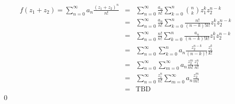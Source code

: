 \documentclass[10pt]{amsart}
\theoremstyle{nonumberplain}
\begin{document}
\begin{enumerate}[label={\bf {\arabic*}:}]
\begin{eqnarray*}
f(z_1 + z_2) = \sum_{n=0}^\infty a_n\frac{(z_1 + z_2)^n}{n!} &=& \sum_{n=0}^{\infty} \frac{a_n}{n!} \sum_{k=0}^{n} {n \choose k}z_1^k z_2^{n-k} \\
											   &=& \sum_{n=0}^{\infty} \frac{a_n}{n!} \sum_{k=0}^{n} \frac{n!}{(n-k)! k!}z_1^k z_2^{n-k} \\
											   &=& \sum_{n=0}^{\infty} \frac{n!}{n!} \sum_{k=0}^{n} \frac{a_n}{(n-k)! k!}z_1^k z_2^{n-k} \\
											   &=& \sum_{n=0}^{\infty} \sum_{k=0}^{n} a_n\frac{z_2^{n-k}}{(n-k)!}\frac{z_1^k}{ k!} \\
											   &=& \sum_{n=0}^{\infty} \sum_{m=0}^{\infty} a_n\frac{z_2^m}{m!}\frac{z_1^n}{ n!} \\
											   &=& \sum_{n=0}^{\infty} \frac{z_1^n}{ n!}\sum_{m=0}^{\infty} a_n\frac{z_2^m}{m!} \\
											   &=& \text{TBD}
\end{eqnarray*}
\qed
  

\end{enumerate}
\end{document}
